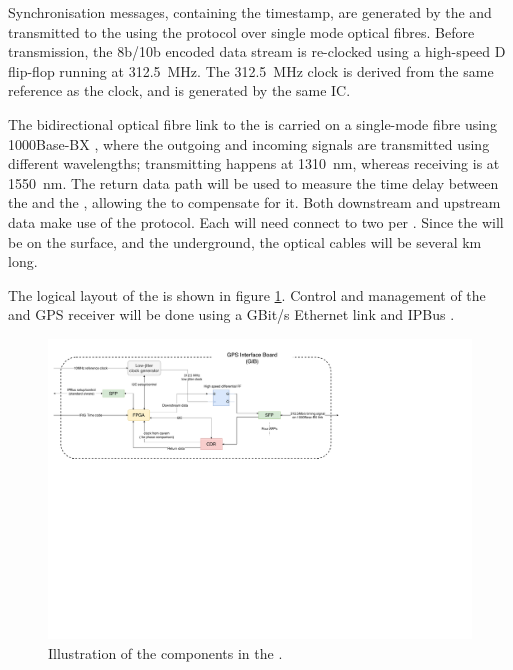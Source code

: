 \documentclass{dune}
\begin{document}
Synchronisation messages, containing the  timestamp, are generated by the  and transmitted to the  using the  protocol over single mode optical fibres. Before transmission, the 8b/10b encoded  data stream is re-clocked using a high-speed D flip-flop running at \SI{312.5}{\MHz}. The \SI{312.5}{\MHz} clock is derived from the same reference as the  clock, and is generated by the same IC.

The bidirectional optical fibre link to the  is carried on a single-mode fibre using 1000Base-BX , where the outgoing and incoming signals are transmitted using different wavelengths; transmitting happens at \SI{1310}{nm}, whereas receiving is at \SI{1550}{nm}. The return data path will be used to measure the time delay between the  and the , allowing the  to compensate for it. Both downstream and upstream data make use of the  protocol. Each  will need connect to two  per . Since the  will be on the surface, and the  underground, the optical cables will be several km long.

The logical layout of the  is shown in figure \ref{fig:gib_layout}. Control and management of the  and GPS receiver will be done using a GBit/s Ethernet link and IPBus \cite{ipbus}.

\begin{figure}[h]
\includegraphics[width=\textwidth]{gib_block_diagram.pdf}
\caption{Illustration of the components in the .}
\label{fig:gib_layout}
\end{figure}
\end{document}
